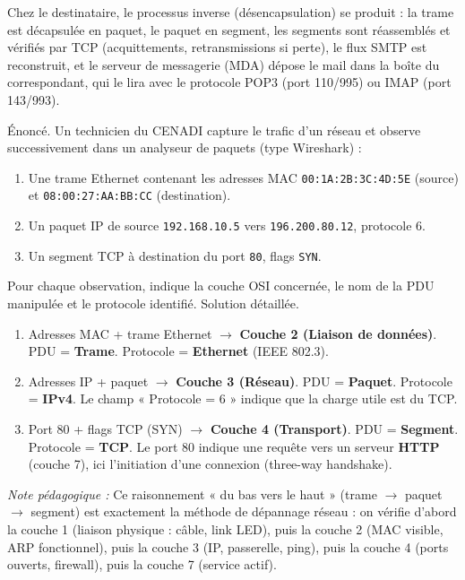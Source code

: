 \documentclass[11pt]{article}
\newcommand{\cle}[1]{{\popxbold\color{popdark}#1}}
\begin{document}
Chez le destinataire, le processus inverse (désencapsulation) se produit : la trame est décapsulée en paquet, le paquet en segment, les segments sont réassemblés et vérifiés par TCP (acquittements, retransmissions si perte), le flux SMTP est reconstruit, et le serveur de messagerie (MDA) dépose le mail dans la boîte du correspondant, qui le lira avec le protocole \cle{POP3} (port 110/995) ou \cle{IMAP} (port 143/993).

\begin{exoresolu}
Énoncé. Un technicien du CENADI capture le trafic d'un réseau et observe successivement dans un analyseur de paquets (type Wireshark) :
\begin{enumerate}
\item Une trame Ethernet contenant les adresses MAC \texttt{00:1A:2B:3C:4D:5E} (source) et \texttt{08:00:27:AA:BB:CC} (destination).
\item Un paquet IP de source \texttt{192.168.10.5} vers \texttt{196.200.80.12}, protocole 6.
\item Un segment TCP à destination du port \texttt{80}, flags \texttt{SYN}.
\end{enumerate}
Pour chaque observation, indique la couche OSI concernée, le nom de la PDU manipulée et le protocole identifié.
\tcblower
Solution détaillée.
\begin{enumerate}
\item[(1)] Adresses MAC + trame Ethernet $\rightarrow$ \textbf{Couche 2 (Liaison de données)}. PDU = \textbf{Trame}. Protocole = \textbf{Ethernet} (IEEE 802.3).
\item[(2)] Adresses IP + paquet $\rightarrow$ \textbf{Couche 3 (Réseau)}. PDU = \textbf{Paquet}. Protocole = \textbf{IPv4}. Le champ « Protocole = 6 » indique que la charge utile est du TCP.
\item[(3)] Port 80 + flags TCP (SYN) $\rightarrow$ \textbf{Couche 4 (Transport)}. PDU = \textbf{Segment}. Protocole = \textbf{TCP}. Le port 80 indique une requête vers un serveur \textbf{HTTP} (couche 7), ici l'initiation d'une connexion (three-way handshake).
\end{enumerate}
\emph{Note pédagogique :} Ce raisonnement « du bas vers le haut » (trame $\rightarrow$ paquet $\rightarrow$ segment) est exactement la méthode de dépannage réseau : on vérifie d'abord la couche 1 (liaison physique : câble, link LED), puis la couche 2 (MAC visible, ARP fonctionnel), puis la couche 3 (IP, passerelle, ping), puis la couche 4 (ports ouverts, firewall), puis la couche 7 (service actif).
\end{exoresolu}
\end{document}
